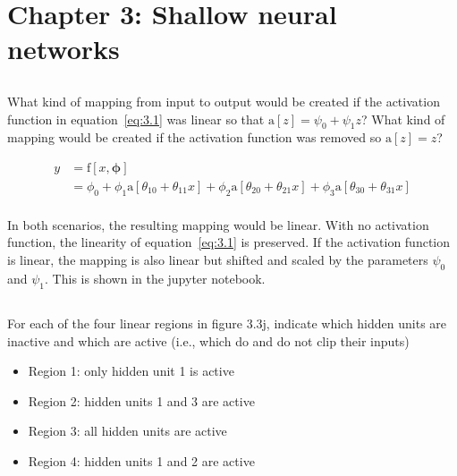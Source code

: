 \documentclass[12pt]{report}
\begin{document}
\section*{Chapter 3: Shallow neural networks}

\subsection{}
\begin{mdframed}
    What kind of mapping from input to output would be created if the activation function in equation~\eqref{eq:3.1} was linear so that $\text{a}[z] = \psi_{0} + \psi_{1}z$? What kind of mapping would be created if the activation function was removed so $\text{a}[z] = z$?

    \begin{align*}
        y & = \text{f}[x, \boldsymbol{\phi}]                                                                                                                        \\
          & = \phi_{0} + \phi_{1}\text{a}[\theta_{10} + \theta_{11}x] + \phi_{2}\text{a}[\theta_{20} + \theta_{21}x] + \phi_{3}\text{a}[\theta_{30} + \theta_{31}x] \\
        \label{eq:3.1}
        \tag{3.1}
    \end{align*}
\end{mdframed}

In both scenarios, the resulting mapping would be linear. With no activation function, the linearity of equation~\eqref{eq:3.1} is preserved. If the activation function is linear, the mapping is also linear but shifted and scaled by the parameters $\psi_{0}$ and $\psi_{1}$. This is shown in the jupyter notebook.

\subsection{}
\begin{mdframed}
    For each of the four linear regions in figure 3.3j, indicate which hidden units are inactive and which are active (i.e., which do and do not clip their inputs)
\end{mdframed}

\begin{itemize}
    \item Region 1: only hidden unit 1 is active
    \item Region 2: hidden units 1 and 3 are active
    \item Region 3: all hidden units are active
    \item Region 4: hidden units 1 and 2 are active
\end{itemize}
\end{document}

